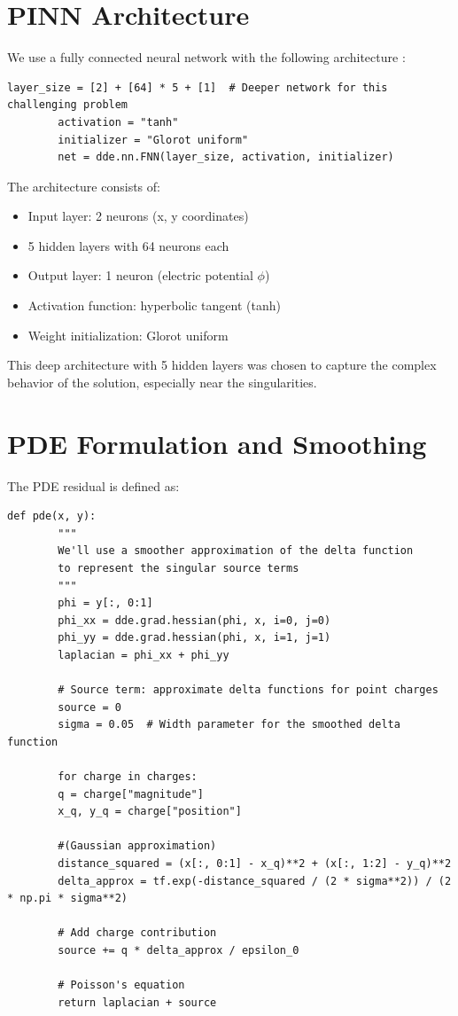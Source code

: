\documentclass[12pt,a4paper]{report}
\begin{document}
	\section{PINN Architecture}
	We use a fully connected neural network with the following architecture \cite{lu2021deepxde, goodfellow2016deep}:
	
	\begin{lstlisting}[caption={Network architecture definition}]
		layer_size = [2] + [64] * 5 + [1]  # Deeper network for this challenging problem
		activation = "tanh"
		initializer = "Glorot uniform"
		net = dde.nn.FNN(layer_size, activation, initializer)
	\end{lstlisting}
	
	The architecture consists of:
	\begin{itemize}
		\item Input layer: 2 neurons (x, y coordinates)
		\item 5 hidden layers with 64 neurons each
		\item Output layer: 1 neuron (electric potential $\phi$)
		\item Activation function: hyperbolic tangent (tanh)
		\item Weight initialization: Glorot uniform
	\end{itemize}
	
	This deep architecture with 5 hidden layers was chosen to capture the complex behavior of the solution, especially near the singularities.
	
	\section{PDE Formulation and Smoothing}
	The PDE residual is defined as:
	
	\begin{lstlisting}[caption={PDE definition with smoothed source terms}]
		def pde(x, y):
		"""
		We'll use a smoother approximation of the delta function
		to represent the singular source terms
		"""
		phi = y[:, 0:1]
		phi_xx = dde.grad.hessian(phi, x, i=0, j=0)
		phi_yy = dde.grad.hessian(phi, x, i=1, j=1)
		laplacian = phi_xx + phi_yy
		
		# Source term: approximate delta functions for point charges
		source = 0
		sigma = 0.05  # Width parameter for the smoothed delta function
		
		for charge in charges:
		q = charge["magnitude"]
		x_q, y_q = charge["position"]
		
		#(Gaussian approximation)
		distance_squared = (x[:, 0:1] - x_q)**2 + (x[:, 1:2] - y_q)**2
		delta_approx = tf.exp(-distance_squared / (2 * sigma**2)) / (2 * np.pi * sigma**2)
		
		# Add charge contribution
		source += q * delta_approx / epsilon_0
		
		# Poisson's equation
		return laplacian + source
	\end{lstlisting}
	
\end{document}
